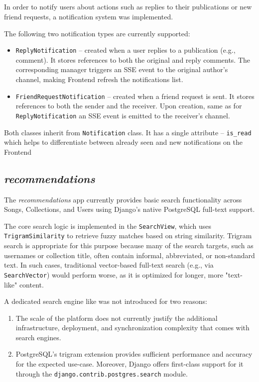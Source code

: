 \subsection{}\label{subsec:notif}
In order to notify users about actions such as replies to their publications
or new friend requests, a notification system was implemented.

The following two notification types are currently supported:
\begin{itemize}
    \item \texttt{ReplyNotification} – created when a user replies to a publication (e.g., comment).
    It stores references to both the original and reply comments. The corresponding manager triggers an SSE
    event to the original author's channel, making Frontend refresh the notifications list.
    \item \texttt{FriendRequestNotification} – created when a friend request is sent.
    It stores references to both the sender and the receiver. Upon creation, same as for \texttt{ReplyNotification}
    an SSE event is emitted to the receiver's channel.
\end{itemize}

Both classes inherit from \texttt{Notification} class. It has a single attribute -- \texttt{is\_read} which helps to
differentiate between already seen and new notifications on the Frontend

\subsection{\textit{recommendations}}
The \textit{recommendations} app currently provides basic search functionality across Songs,
Collections, and Users using Django’s native PostgreSQL full-text support.

The core search logic is implemented in the \texttt{SearchView},
which uses \texttt{TrigramSimilarity} to retrieve fuzzy matches based on string similarity.
Trigram search is appropriate for this purpose because many
of the search targets, such as usernames or collection title, often contain informal,
abbreviated, or non-standard text.
In such cases, traditional vector-based full-text search
(e.g., via \texttt{SearchVector}) would perform worse, as it is optimized for longer,
more "text-like" content.

A dedicated search engine like  was not introduced for two reasons:
\begin{enumerate}
    \item The scale of the platform does not currently justify the additional
    infrastructure, deployment, and synchronization complexity that comes
    with search engines.
    \item PostgreSQL's trigram extension provides sufficient performance
    and accuracy for the expected use-case.
    Moreover, Django offers first-class support for it
    through the \texttt{django.contrib.postgres.search} module.
\end{enumerate}

